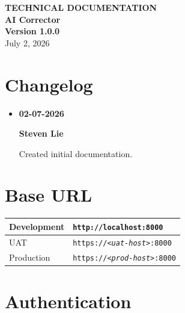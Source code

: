 \documentclass[11pt]{article}
\begin{document}
\thispagestyle{empty}
\begin{center}
  \vspace*{2cm}
  {\LARGE\bfseries TECHNICAL DOCUMENTATION}\\[0.8em]
  {\Large\bfseries AI Corrector}\\[0.6em]
  {\Large\bfseries Version 1.0.0}\\[2em]
  July 2, 2026
\end{center}

\hypersetup{linkcolor=black}
{\setlength{\parskip}{0pt}\tableofcontents}
\hypersetup{linkcolor=blue}
\newpage

\section{Changelog}

\begin{itemize}[leftmargin=2em]
  \item \textbf{02-07-2026}

    \textbf{Steven Lie}

    Created initial documentation.
\end{itemize}

\section{Base URL}

\begin{tabular}{|H{3cm}|p{12.1cm}|}
  \hline
  Development & \texttt{http://localhost:8000} \\
  \hline
  UAT         & \texttt{https://\textit{<uat-host>}:8000} \\
  \hline
  Production  & \texttt{https://\textit{<prod-host>}:8000} \\
  \hline
\end{tabular}

\section{Authentication}
\end{document}

